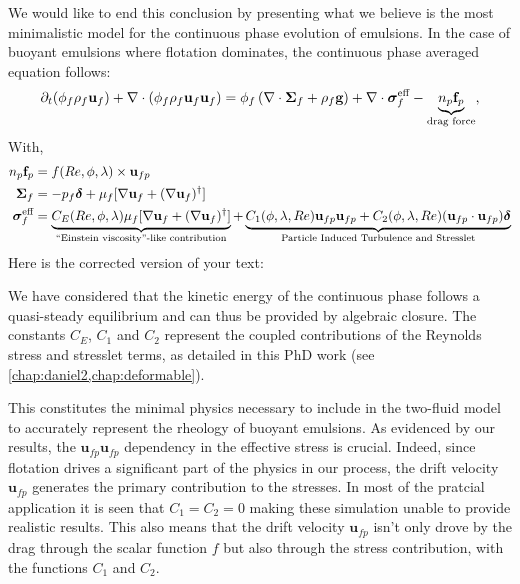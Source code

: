 We would like to end this conclusion by presenting what we believe is the most minimalistic model for the continuous phase evolution of emulsions.
In the case of buoyant emulsions where flotation dominates, the continuous phase averaged equation follows: 
\begin{align}
    \partial_t (\phi_f\rho_f \textbf{u}_f)
    + \mathbf{\nabla}\cdot (\phi_f\rho_f \textbf{u}_f\textbf{u}_f)
    = \phi_f 
    \left(\mathbf{\nabla}\cdot \bm{\Sigma}_f
    + \rho_f \textbf{g}\right)
    + \mathbf{\nabla}\cdot  \bm{\sigma}_f^{\text{eff}}
    - \underbrace{n_p \textbf{f}_p}_\text{drag force},
\end{align}
With, 
\begin{align}
    n_p \textbf{f}_p  
    &= 
    f(Re,\phi, \lambda) \times \textbf{u}_{fp}\\
  \bm\Sigma_f &= - p_f \bm\delta + \mu_f [\mathbf{\nabla} \textbf{u}_f +  (\mathbf{\nabla} \textbf{u}_f)^\dagger ] \\
    \bm{\sigma}^{\text{eff}}_f 
    &= \underbrace{C_E(Re,\phi,\lambda) \mu_f [\mathbf{\nabla} \textbf{u}_f +  (\mathbf{\nabla} \textbf{u}_f)^\dagger ] }_\text{``Einstein viscosity''-like contribution}
    + 
    \underbrace{
      C_1(\phi,\lambda,Re)\textbf{u}_{fp}\textbf{u}_{fp}
    + C_2(\phi,\lambda,Re)(\textbf{u}_{fp}\cdot \textbf{u}_{fp})     \bm\delta}_\text{Particle Induced Turbulence and Stresslet}
\end{align}
Here is the corrected version of your text:

We have considered that the kinetic energy of the continuous phase follows a quasi-steady equilibrium and can thus be provided by algebraic closure.
The constants $C_E$, $C_1$ and $C_2$ represent the coupled contributions of the Reynolds stress and stresslet terms, as detailed in this PhD work (see \ref{chap:daniel2,chap:deformable}).

This constitutes the minimal physics necessary to include in the two-fluid model to accurately represent the rheology of buoyant emulsions.
As evidenced by our results, the $\textbf{u}_{fp}\textbf{u}_{fp}$ dependency in the effective stress is crucial.
Indeed, since flotation drives a significant part of the physics in our process, the drift velocity $\textbf{u}_{fp}$ generates the primary contribution to the stresses.
In most of the pratcial application it is seen that $C_1 = C_2 = 0$ making these simulation unable to provide realistic results.
This also means that the drift velocity $\textbf{u}_{fp}$ isn't only drove by the drag through the scalar function $f$ but also through the stress contribution, with the functions $C_1$ and $C_2$.


